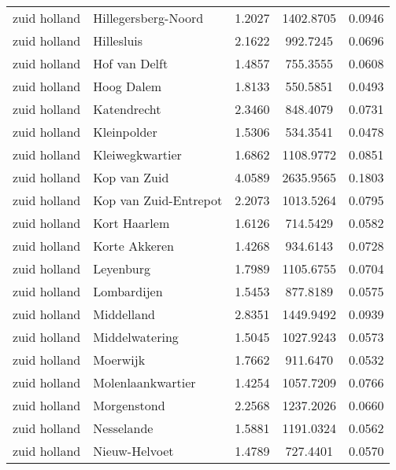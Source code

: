 \begin{longtable}{llccc}
	zuid holland  & Hillegersberg-Noord              & 1.2027  & 1402.8705 & 0.0946          \\
	zuid holland  & Hillesluis                       & 2.1622  & 992.7245  & 0.0696          \\
	zuid holland  & Hof van Delft                    & 1.4857  & 755.3555  & 0.0608          \\
	zuid holland  & Hoog Dalem                       & 1.8133  & 550.5851  & 0.0493          \\
	zuid holland  & Katendrecht                      & 2.3460  & 848.4079  & 0.0731          \\
	zuid holland  & Kleinpolder                      & 1.5306  & 534.3541  & 0.0478          \\
	zuid holland  & Kleiwegkwartier                  & 1.6862  & 1108.9772 & 0.0851          \\
	zuid holland  & Kop van Zuid                     & 4.0589  & 2635.9565 & 0.1803          \\
	zuid holland  & Kop van Zuid-Entrepot            & 2.2073  & 1013.5264 & 0.0795          \\
	zuid holland  & Kort Haarlem                     & 1.6126  & 714.5429  & 0.0582          \\
	zuid holland  & Korte Akkeren                    & 1.4268  & 934.6143  & 0.0728          \\
	zuid holland  & Leyenburg                        & 1.7989  & 1105.6755 & 0.0704          \\
	zuid holland  & Lombardijen                      & 1.5453  & 877.8189  & 0.0575          \\
	zuid holland  & Middelland                       & 2.8351  & 1449.9492 & 0.0939          \\
	zuid holland  & Middelwatering                   & 1.5045  & 1027.9243 & 0.0573          \\
	zuid holland  & Moerwijk                         & 1.7662  & 911.6470  & 0.0532          \\
	zuid holland  & Molenlaankwartier                & 1.4254  & 1057.7209 & 0.0766          \\
	zuid holland  & Morgenstond                      & 2.2568  & 1237.2026 & 0.0660          \\
	zuid holland  & Nesselande                       & 1.5881  & 1191.0324 & 0.0562          \\
	zuid holland  & Nieuw-Helvoet                    & 1.4789  & 727.4401  & 0.0570          \\

\end{longtable}
